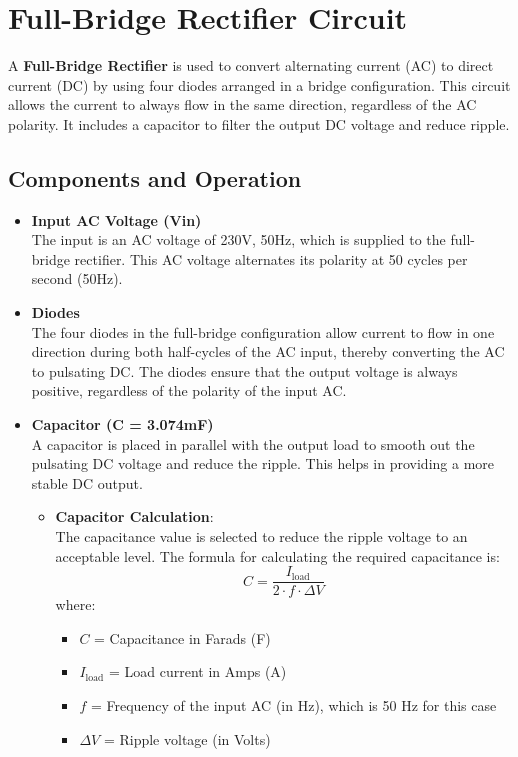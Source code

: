 \documentclass[12pt]{article}
\begin{document}
\section*{Full-Bridge Rectifier Circuit}
A \textbf{Full-Bridge Rectifier} is used to convert alternating current (AC) to direct current (DC) by using four diodes arranged in a bridge configuration. This circuit allows the current to always flow in the same direction, regardless of the AC polarity. It includes a capacitor to filter the output DC voltage and reduce ripple.

\subsection*{Components and Operation}

\begin{itemize}
    \item \textbf{Input AC Voltage (Vin)} \\
    The input is an AC voltage of 230V, 50Hz, which is supplied to the full-bridge rectifier. This AC voltage alternates its polarity at 50 cycles per second (50Hz).

    \item \textbf{Diodes} \\
    The four diodes in the full-bridge configuration allow current to flow in one direction during both half-cycles of the AC input, thereby converting the AC to pulsating DC. The diodes ensure that the output voltage is always positive, regardless of the polarity of the input AC.

    \item \textbf{Capacitor (C = 3.074mF)} \\
    A capacitor is placed in parallel with the output load to smooth out the pulsating DC voltage and reduce the ripple. This helps in providing a more stable DC output.

    \begin{itemize}
        \item \textbf{Capacitor Calculation}: \\
        The capacitance value is selected to reduce the ripple voltage to an acceptable level. The formula for calculating the required capacitance is:
        \[
        C = \frac{I_{\text{load}}}{2 \cdot f \cdot \Delta V}
        \]
        where:
        \begin{itemize}
            \item $C$ = Capacitance in Farads (F)
            \item $I_{\text{load}}$ = Load current in Amps (A)
            \item $f$ = Frequency of the input AC (in Hz), which is 50 Hz for this case
            \item $\Delta V$ = Ripple voltage (in Volts)
        \end{itemize}


\end{itemize}
\end{itemize}
\end{document}
